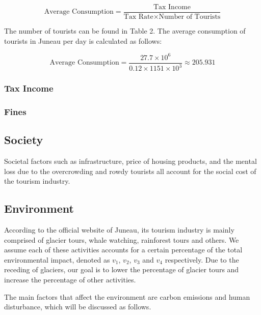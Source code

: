 \begin{equation}
    \text{Average Consumption} = \frac{\text{Tax Income}}{\text{Tax Rate} \times \text{Number of Tourists}}
\end{equation}

The number of tourists can be found in Table 2. The average consumption of 
tourists in Juneau per day is calculated as follows:

\begin{equation}
    \text{Average Consumption} = \frac{27.7 \times 10^6}{0.12 \times 1151 \times 10^3} \approx 205.931
\end{equation}

\subsubsection{Tax Income}

\subsubsection{Fines}





\subsection{Society}

Societal factors such as infrastructure, price of housing products, and the mental
loss due to the overcrowding and rowdy tourists all account for the social cost of the tourism industry.

\subsection{Environment}

According to the official website of Juneau, its tourism industry is 
mainly comprised of glacier tours, whale watching, rainforest tours and others.
We assume each of these activities accounts for a certain percentage of the total environmental impact,
denoted as $v_1$, $v_2$, $v_3$ and $v_4$ respectively. Due to the receding of glaciers,
our goal is to lower the percentage of glacier tours and increase the percentage of other activities.

The main factors that affect the environment are carbon emissions and human disturbance, which will be discussed as follows.